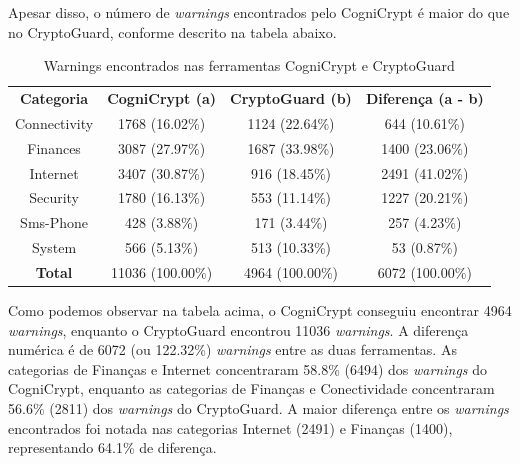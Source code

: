 Apesar disso, o número de \textit{warnings} encontrados pelo CogniCrypt é maior do que no CryptoGuard, conforme descrito na tabela abaixo.

\begin{table}[!htbp]
  \centering
  \begin{tabular}{|c|c|c|c|}
  
\textbf{Categoria}   & \textbf{CogniCrypt (a)}   &  \textbf{CryptoGuard (b)}     &  \textbf{Diferença (a - b)} \\ 
Connectivity           & \num{1768} (\num{16.02}\%)  &  \num{1124} (\num{22.64}\%)  & \num{644} (\num{10.61}\%) \\
Finances                &     \num{3087} (\num{27.97}\%)     &     \num{1687} (\num{33.98}\%)     &     \num{1400} (\num{23.06}\%)\\
Internet                 &     \num{3407} (\num{30.87}\%)     &     \num{916} (\num{18.45}\%)     &     \num{2491} (\num{41.02}\%)\\
Security                 &     \num{1780} (\num{16.13}\%)     &     \num{553} (\num{11.14}\%)     &     \num{1227} (\num{20.21}\%)\\
Sms-Phone            &     \num{428} (\num{3.88}\%)     &     \num{171} (\num{3.44}\%)     &     \num{257} (\num{4.23}\%)\\
System                  &     \num{566} (\num{5.13}\%)     &     \num{513} (\num{10.33}\%)     &     \num{53} (\num{0.87}\%)\\
\textbf{Total}                     &     \num{11036} (\num{100.00}\%)     &     \num{4964} (100.00\%)     &     \num{6072} (\num{100.00}\%)\\
\end{tabular}
    
  \caption{Warnings encontrados nas ferramentas CogniCrypt e CryptoGuard}
\label{AplicativosComWarning}
\end{table}

Como podemos observar na tabela acima, o CogniCrypt conseguiu encontrar \num{4964} \textit{warnings}, enquanto o CryptoGuard encontrou \num{11036} \textit{warnings}. A diferença numérica é de \num{6072} (ou \num{122.32}\%) \textit{warnings} entre as duas ferramentas. As categorias de Finanças e Internet concentraram \num{58.8}\% (\num{6494}) dos \textit{warnings} do CogniCrypt, enquanto as categorias de Finanças e Conectividade concentraram \num{56.6}\% (\num{2811}) dos \textit{warnings} do CryptoGuard. A maior diferença entre os \textit{warnings} encontrados foi notada nas categorias Internet (\num{2491}) e Finanças (\num{1400}), representando \num{64.1}\% de diferença.

